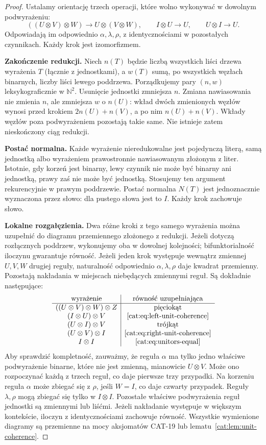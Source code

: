 \begin{proof}
Ustalamy orientację trzech operacji, które wolno wykonywać w dowolnym podwyrażeniu:
\[
((U\otimes V)\otimes W)\to U\otimes(V\otimes W),\qquad
I\otimes U\to U,\qquad U\otimes I\to U.
\]
Odpowiadają im odpowiednio $\alpha,\lambda,\rho$, z identycznościami w pozostałych czynnikach. Każdy krok jest izomorfizmem.

\textbf{Zakończenie redukcji.}
Niech $n(T)$ będzie liczbą wszystkich liści drzewa wyrażenia $T$ (łącznie z jednostkami), a $w(T)$ sumą, po wszystkich węzłach binarnych, liczby liści lewego poddrzewa. Porządkujemy pary $(n,w)$ leksykograficznie w $\mathbb N^2$. Usunięcie jednostki zmniejsza $n$. Zmiana nawiasowania nie zmienia $n$, ale zmniejsza $w$ o $n(U)$: wkład dwóch zmienionych węzłów wynosi przed krokiem $2n(U)+n(V)$, a po nim $n(U)+n(V)$. Wkłady węzłów poza podwyrażeniem pozostają takie same. Nie istnieje zatem nieskończony ciąg redukcji.

\textbf{Postać normalna.}
Każde wyrażenie nieredukowalne jest pojedynczą literą, samą jednostką albo wyrażeniem prawostronnie nawiasowanym złożonym z liter. Istotnie, gdy korzeń jest binarny, lewy czynnik nie może być binarny ani jednostką, prawy zaś nie może być jednostką. Stosujemy ten argument rekurencyjnie w prawym poddrzewie. Postać normalna $N(T)$ jest jednoznacznie wyznaczona przez słowo: dla pustego słowa jest to $I$. Każdy krok zachowuje słowo.

\textbf{Lokalne rozgałęzienia.}
Dwa różne kroki z tego samego wyrażenia można uzupełnić do diagramu przemiennego złożonego z redukcji. Jeżeli dotyczą rozłącznych poddrzew, wykonujemy oba w dowolnej kolejności; bifunktorialność iloczynu gwarantuje równość. Jeżeli jeden krok występuje wewnątrz zmiennej $U,V,W$ drugiej reguły, naturalność odpowiednio $\alpha,\lambda,\rho$ daje kwadrat przemienny. Pozostają nakładania w miejscach niebędących zmiennymi reguł. Są dokładnie następujące:
\[
\begin{array}{c|c}
\text{wyrażenie}&\text{równość uzupełniająca}\\ \hline
((U\otimes V)\otimes W)\otimes Z&\text{pięciokąt}\\
(I\otimes U)\otimes V&\eqref{cat:eq:left-unit-coherence}\\
(U\otimes I)\otimes V&\text{trójkąt}\\
(U\otimes V)\otimes I&\eqref{cat:eq:right-unit-coherence}\\
I\otimes I&\eqref{cat:eq:unitors-equal}
\end{array}
\]
Aby sprawdzić kompletność, zauważmy, że reguła $\alpha$ ma tylko jedno właściwe podwyrażenie binarne, które nie jest zmienną, mianowicie $U\otimes V$. Może ono rozpoczynać każdą z trzech reguł, co daje pierwsze trzy przypadki. Na korzeniu reguła $\alpha$ może zbiegać się z $\rho$, jeśli $W=I$, co daje czwarty przypadek. Reguły $\lambda,\rho$ mogą zbiegać się tylko w $I\otimes I$. Pozostałe właściwe podwyrażenia reguł jednostki są zmiennymi lub liśćmi. Jeżeli nakładanie występuje w większym kontekście, iloczyn z identycznościami zachowuje równość. Wszystkie wymienione diagramy są przemienne na mocy aksjomatów CAT-19 lub lematu~\ref{cat:lem:unit-coherence}.


\end{proof}
